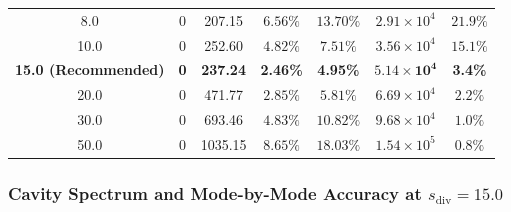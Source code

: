 \documentclass[VANCOUVER]{USG}
\begin{document}
\begin{table}[!t]
{\begin{tabular}{ccccccc}
            8.0                             & 0                     & 207.15                                      & $6.56\%$                                             & $13.70\%$                                           & $2.91 \times 10^4$                                      & $21.9\%$                                                   \\
            10.0                            & 0                     & 252.60                                      & $4.82\%$                                             & $7.51\%$                                            & $3.56 \times 10^4$                                      & $15.1\%$                                                   \\
            \textbf{15.0 (Recommended)}     & \textbf{0}            & \textbf{237.24}                             & \textbf{2.46\%}                                      & \textbf{4.95\%}                                     & $\mathbf{5.14 \times 10^4}$                             & \textbf{3.4\%}                                             \\
            20.0                            & 0                     & 471.77                                      & $2.85\%$                                             & $5.81\%$                                            & $6.69 \times 10^4$                                      & $2.2\%$                                                    \\
            30.0                            & 0                     & 693.46                                      & $4.83\%$                                             & $10.82\%$                                           & $9.68 \times 10^4$                                      & $1.0\%$                                                    \\
            50.0                            & 0                     & 1035.15                                     & $8.65\%$                                             & $18.03\%$                                           & $1.54 \times 10^5$                                      & $0.8\%$                                                    \\
            \bottomrule
        \end{tabular}
    }
\end{table}

\subsubsection{Cavity Spectrum and Mode-by-Mode Accuracy at $s_{\mathrm{div}} = 15.0$}
\label{subsubsec:cavity_modes_15}
\end{document}
